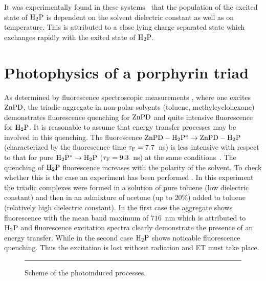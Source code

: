 \documentclass[12pt,twoside,a4paper]{report}
\begin{document}
%
%
It was experimentally found in these systems~\cite{will98} that 
the population of the excited state of ${\rm H_2P}$ is dependent on the solvent 
dielectric constant as well as on temperature. This is attributed to a close 
lying charge separated state which exchanges rapidly with the exited state 
of ${\rm H_2P}$. 
 
\section{Photophysics of a porphyrin triad} \label{photo}
 As determined by fluorescence spectroscopic measurements \cite{will98}, 
where one excites ${\rm ZnPD}$, the triadic aggregate 
in non-polar solvents (toluene, methylcyclohexane)
demonstrates 
fluorescence quenching for ${\rm ZnPD}$ 
and quite intensive fluorescence for 
${\rm H_2P}$.
It is reasonable to assume that energy transfer processes may be involved in 
this quenching.
The fluorescence ${\rm ZnPD-H_2P^* \to ZnPD-H_2P}$ (characterized by the fluorescence time $\tau_{\rm F}=7.7$~ns)
is less intensive
with respect to that for pure
 ${\rm H_2P^* \to H_2P}$ 
($\tau_{\rm F}=9.3$~ns)
at the same conditions~\cite{will98}.
The quenching of ${\rm H_2P}$ fluorescence
increases with the polarity of the solvent.
To check whether this is the case 
an experiment has been performed \cite{will98}.
In this experiment the triadic 
complexes were formed in 
a solution of  pure toluene (low dielectric constant) and then in 
an admixture of acetone (up to 20\%) added to  toluene 
(relatively high dielectric constant). 
In the first case the aggregate shows 
{fluorescence} 
with the mean band maximum of
$716$~nm which is attributed to 
${\rm H_2P}$ and 
fluorescence excitation spectra
clearly demonstrate the presence of an energy transfer. 
While in the 
second case ${\rm H_2P}$ 
shows noticable fluorescence quenching.
Thus the excitation 
is lost without radiation and ET must take place. 
\begin{footnotesize}\begin{figure}[ht] 
\centering 
\parbox{14.3cm}{\rule{5cm}{0cm}\epsfxsize=7cm 
}
\caption[Scheme of the photoinduced processes]
{\small 
\label{schem-photo} 
Scheme of the photoinduced processes.}
\end{figure}\end{footnotesize} 
 
\end{document}
